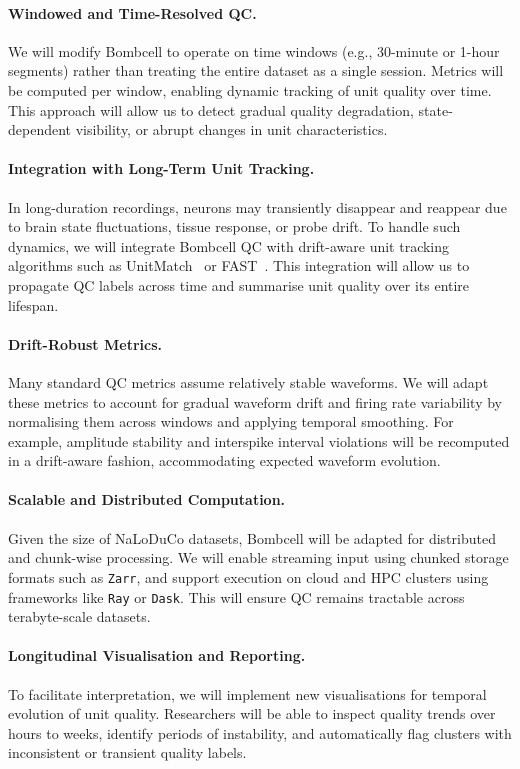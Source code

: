 \paragraph{Windowed and Time-Resolved QC.}
We will modify Bombcell to operate on time windows (e.g., 30-minute or 1-hour segments) rather than treating the entire dataset as a single session. Metrics will be computed per window, enabling dynamic tracking of unit quality over time. This approach will allow us to detect gradual quality degradation, state-dependent visibility, or abrupt changes in unit characteristics.

\paragraph{Integration with Long-Term Unit Tracking.}
In long-duration recordings, neurons may transiently disappear and reappear due to brain state fluctuations, tissue response, or probe drift. To handle such dynamics, we will integrate Bombcell QC with drift-aware unit tracking algorithms such as UnitMatch~\citep{vanBeestEtAl24} or FAST~\citep{dhawaleEtAl17}. This integration will allow us to propagate QC labels across time and summarise unit quality over its entire lifespan.

\paragraph{Drift-Robust Metrics.}
Many standard QC metrics assume relatively stable waveforms. We will adapt these metrics to account for gradual waveform drift and firing rate variability by normalising them across windows and applying temporal smoothing. For example, amplitude stability and interspike interval violations will be recomputed in a drift-aware fashion, accommodating expected waveform evolution.

\paragraph{Scalable and Distributed Computation.}
Given the size of NaLoDuCo datasets, Bombcell will be adapted for distributed and chunk-wise processing. We will enable streaming input using chunked storage formats such as \texttt{Zarr}, and support execution on cloud and HPC clusters using frameworks like \texttt{Ray} or \texttt{Dask}. This will ensure QC remains tractable across terabyte-scale datasets.

\paragraph{Longitudinal Visualisation and Reporting.}
To facilitate interpretation, we will implement new visualisations for temporal evolution of unit quality. Researchers will be able to inspect quality trends over hours to weeks, identify periods of instability, and automatically flag clusters with inconsistent or transient quality labels.

